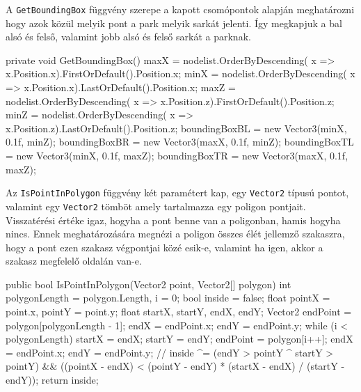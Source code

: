 A \texttt{GetBoundingBox} függvény szerepe a kapott csomópontok alapján meghatározni hogy azok közül melyik pont a park melyik sarkát jelenti. Így megkapjuk a bal alsó és felső, valamint jobb alsó és felső sarkát a parknak.
\begin{cpp}
private void GetBoundingBox()
    {
        maxX = nodelist.OrderByDescending(
        x => x.Position.x).FirstOrDefault().Position.x;
        minX = nodelist.OrderByDescending(
        x => x.Position.x).LastOrDefault().Position.x;
        maxZ = nodelist.OrderByDescending(
        x => x.Position.z).FirstOrDefault().Position.z;
        minZ = nodelist.OrderByDescending(
        x => x.Position.z).LastOrDefault().Position.z;
        boundingBoxBL = new Vector3(minX, 0.1f, minZ);
        boundingBoxBR = new Vector3(maxX, 0.1f, minZ);
        boundingBoxTL = new Vector3(minX, 0.1f, maxZ);
        boundingBoxTR = new Vector3(maxX, 0.1f, maxZ);
    }
\end{cpp}
Az \texttt{IsPointInPolygon} függvény két paramétert kap, egy \texttt{Vector2} típusú pontot, valamint egy \texttt{Vector2} tömböt amely tartalmazza egy poligon pontjait. Visszatérési értéke igaz, hogyha a pont benne van a poligonban, hamis hogyha nincs. Ennek meghatározására megnézi a poligon összes élét jellemző szakaszra, hogy a pont ezen szakasz végpontjai közé esik-e, valamint ha igen, akkor a szakasz megfelelő oldalán van-e.
\begin{cpp}
public bool IsPointInPolygon(Vector2 point, Vector2[] polygon)
    {
        int polygonLength = polygon.Length, i = 0;
        bool inside = false;
        float pointX = point.x, pointY = point.y;
        float startX, startY, endX, endY;
        Vector2 endPoint = polygon[polygonLength - 1];
        endX = endPoint.x;
        endY = endPoint.y;
        while (i < polygonLength)
        {
            startX = endX; startY = endY;
            endPoint = polygon[i++];
            endX = endPoint.x; endY = endPoint.y;
            //
            inside ^= (endY > pointY ^ startY > pointY)
                      && ((pointX - endX) < (pointY - endY) * 
                      (startX - endX) / (startY - endY));
        }
        return inside;
    }
\end{cpp}


